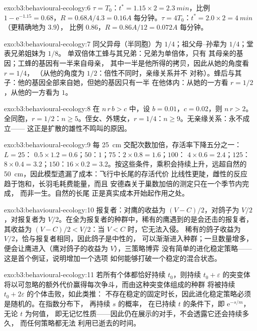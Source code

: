 \begin{solution}{exo:b3:behavioural-ecology:6}
$\tau = T_{0}$：$t^{*} = 1.15\times 2 = \qty{2.3}{min}$，比例 $1 -
\mathrm{e}^{-1.15} = 0.68$，$R = 0.68A/4.3 = 0.16A$ 每分钟。$\tau =
4T_{0}$：$t^{*} = 2.0\times 2 = \qty{4}{min}$（更精确地为 $3.9$），
比例 $0.86$，$R = 0.86A/12 = 0.072A$ 每分钟。
\end{solution}

\begin{solution}{exo:b3:behavioural-ecology:7}
同父异母（半同胞）为 $1/4$；祖父母–孙辈为 $1/4$；堂表兄弟姐妹为 $1/8$。
单双倍体工蜂与其兄弟：兄弟为单倍体，只有
其母亲的基因；工蜂的基因有一半来自母亲，
其中一半是他所得的拷贝，因此从她的角度看 $r = 1/4$，
（从他的角度为 $1/2$：倍性不同时，亲缘关系并不
对称）。蜂后与其子：他的基因全部来自她，但她的基因只有一半
在他体内：从她的一方看 $r = 1/2$，从他的一方看为 $1$。
\end{solution}

\begin{solution}{exo:b3:behavioural-ecology:8}
在 $n\,r\,b > c$ 中，设 $b = 0.01$，$c = 0.02$，则 $n\,r > 2$。全同胞，$r
= 1/2$：$n \ge 5$。侄女、外甥女，$r = 1/4$：$n \ge 9$。无亲缘关系：永不成立——
这正是扩散的雄性不鸣叫的原因。
\end{solution}

\begin{solution}{exo:b3:behavioural-ecology:9}
每 \qty{25}{cm} 交配次数加倍，存活率下降五分之一：$L = 25$：
$0.5\times 1.2 = 0.6$；$50$：$1$；$75$：$2\times 0.8 = 1.6$；$100$：
$4\times 0.6 = 2.4$；$125$：$8\times 0.4 = 3.2$；$150$：$16\times 0.2 =
3.2$。按这些条件，乘积会持续上升，远超自然的
\qty{50}{cm}，因此模型遗漏了成本：飞行中长尾的存活代价
比线性更陡，雌性的反应趋于饱和，长羽毛耗费能量，而且
安德森关于巢数加倍的测定只在一个季节内完成，
而非一生。自然的长尾
正是真实成本开始起作用之处。
\end{solution}

\begin{solution}{exo:b3:behavioural-ecology:10}
报复者：对鹰的收益为 $(V - C)/2$，对鸽子为 $V/2$，对报复者为
$V/2$。在全为报复者的种群中，稀有的鹰遇到的是会还击的报复者，
其收益为 $(V - C)/2 < V/2$：当 $V < C$ 时，它无法入侵。
稀有的鸽子收益为 $V/2$，恰与报复者相同，因此鸽子是中性的，
可以渐渐进入种群；一旦数量增多，
便会让鹰进入（鹰对鸽子的收益为 $V$），三策略博弈
没有简单的进化稳定策略——这是首个例证，说明增加一个选项
如何能够打破一个稳定的混合状态。
\end{solution}

\begin{solution}{exo:b3:behavioural-ecology:11}
若所有个体都恰好持续 $t_{0}$，则持续 $t_{0} +
\varepsilon$ 的突变体将以可忽略的额外代价赢得每次争斗，而由这种突变体组成的种群
将被持续 $t_{0} + 2\varepsilon$ 的个体击败，如此类推：
不存在稳定的固定时长，因此进化稳定策略必须是随机的。在指数分布下，
再持续 $s$ 的概率，
在已持续 $t$ 的条件下，即 $\mathrm{e}^{-s/m}$，无论 $t$ 为何值，
即无记忆性质——因此仍在展示的对手，不会透露它还会持续多久，
而任何策略都无法
利用已逝去的时间。
\end{solution}

